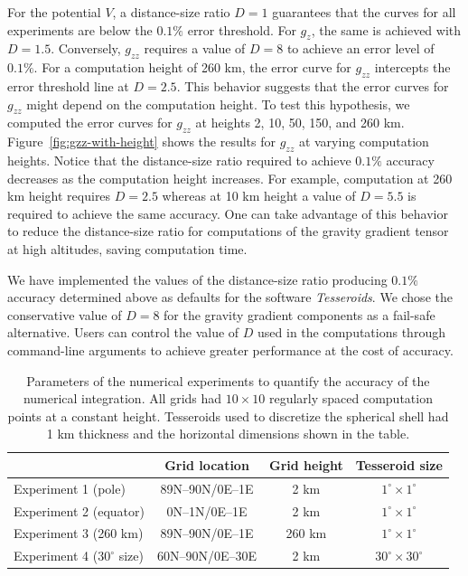 \documentclass[paper,twocolumn,twoside]{geophysics}
\begin{document}
For the potential $V$, a distance-size ratio $D=1$ guarantees that the curves
for all experiments are below the $0.1\%$ error threshold.
For $g_z$, the same is achieved with $D=1.5$.
Conversely, $g_{zz}$ requires a value of $D=8$ to achieve an error level of
$0.1\%$.
For a computation height of 260 km, the error curve for $g_{zz}$
intercepts the error threshold line at $D=2.5$.
This behavior suggests that the error curves for $g_{zz}$ might depend on the
computation height.
To test this hypothesis, we computed the error curves for $g_{zz}$ at
heights 2, 10, 50, 150, and 260 km.
Figure~\ref{fig:gzz-with-height} shows the results for $g_{zz}$ at varying
computation heights.
Notice that the distance-size ratio required to achieve $0.1\%$ accuracy
decreases as the computation height increases.
For example, computation at 260 km height requires $D=2.5$ whereas at 10 km
height a value of $D=5.5$ is required to achieve the same accuracy.
One can take advantage of this behavior to reduce the distance-size ratio for
computations of the gravity gradient tensor at high altitudes,
saving computation time.


We have implemented the values of the distance-size ratio producing $0.1\%$
accuracy determined above as defaults for the software \emph{Tesseroids}.
We chose the conservative value of $D=8$ for the gravity gradient components
as a fail-safe alternative.
Users can control the value of $D$ used in the computations through
command-line arguments to achieve greater performance at the cost of
accuracy.


\begin{table}
\centering
\begin{tabular}{lccc}
    \hline
    ~             & Grid location & Grid height & Tesseroid size \\
    \hline
    Experiment 1 (pole)            & 89N--90N/0E--1E  & 2 km   & $1^\circ \times 1^\circ$ \\
    Experiment 2 (equator)         & 0N--1N/0E--1E    & 2 km   & $1^\circ \times 1^\circ$ \\
    Experiment 3 (260 km)          & 89N--90N/0E--1E  & 260 km & $1^\circ \times 1^\circ$ \\
    Experiment 4 ($30^\circ$ size) & 60N--90N/0E--30E & 2 km   & $30^\circ \times 30^\circ$ \\
    \hline
\end{tabular}
\caption{
    Parameters of the numerical experiments to quantify the accuracy of
    the numerical integration.
    All grids had $10\times10$ regularly spaced computation points at a
    constant height.
    Tesseroids used to discretize the spherical shell had 1 km thickness and
    the horizontal dimensions shown in the table.
}
\label{tbl:experiment}
\end{table}
\end{document}
